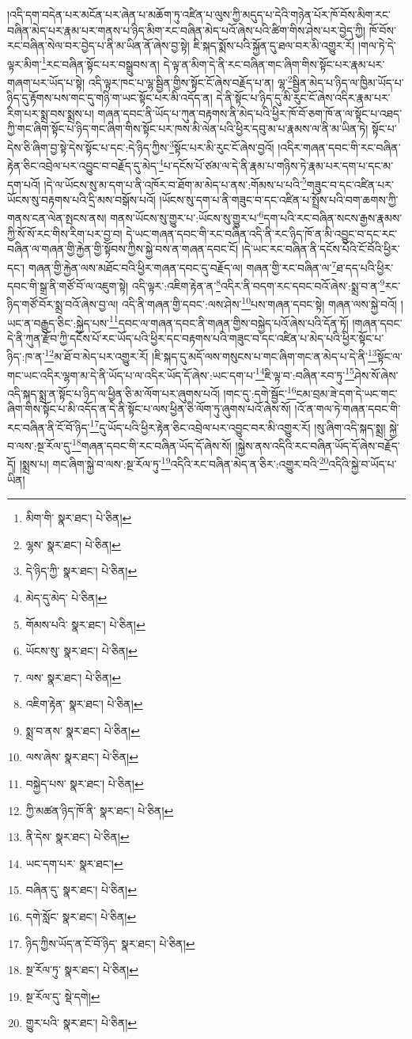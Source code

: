 །འདི་དག་བདེན་པར་མངོན་པར་ཞེན་པ་མཆོག་ཏུ་འཛིན་པ་ལུས་ཀྱི་མདུད་པ་དེའི་གཉེན་པོར་ཁོ་བོས་མིག་རང་བཞིན་མེད་པར་རྣམ་པར་གནས་པ་ཉིད་མིག་རང་བཞིན་མེད་པའོ་ཞེས་པའི་ཚིག་གིས་ཤེས་པར་བྱེད་ཀྱི། ཁོ་བོས་རང་བཞིན་སེལ་བར་བྱེད་པ་ནི་མ་ཡིན་ནོ་ཞེས་བྱ་སྟེ། ཇི་སྐད་སྨོས་པའི་སྐྱོན་དུ་ཐལ་བར་མི་འགྱུར་རོ། །གལ་ཏེ་དེ་ལྟར་མིག་\footnote{མིག་གི་  སྣར་ཐང་།  པེ་ཅིན། }རང་བཞིན་སྟོང་པར་བསྒྲུབས་ན། དེ་ལྟ་ན་མིག་དེ་ནི་རང་བཞིན་གང་ཞིག་གིས་སྟོང་པར་རྣམ་པར་གཞག་པར་ཡོད་པ་སྟེ། འདི་ལྟར་ཁང་པ་ལྷ་སྦྱིན་གྱིས་སྟོང་ངོ་ཞེས་བརྗོད་པ་ན། ལྷ་\footnote{ལྷས་  སྣར་ཐང་།  པེ་ཅིན། }སྦྱིན་མེད་པ་ཉིད་ལ་ཁྱིམ་ཡོད་པ་ཉིད་དུ་རྟོགས་པས་གང་དུ་གཉི་ག་ཡང་སྟོང་པར་མི་འདོད་ན། དེ་ནི་སྟོང་པ་ཉིད་དུ་མི་རུང་ངོ་ཞེས་འདིར་རྣམ་པར་རིག་པར་སྨྲ་བས་སྨྲས་པ། གཞན་དབང་ནི་ཡོད་པ་ཀུན་བརྟགས་ནི་མེད་པའི་ཕྱིར་ཁོ་བོ་ཅག་ཁོ་ན་ལ་སྟོང་པ་འཐད་ཀྱི་གང་ཞིག་སྟོང་པ་ཉིད་གང་ཞིག་གིས་སྟོང་པར་ཁས་མི་ལེན་པའི་ཕྱིར་དབུ་མ་པ་རྣམས་ལ་ནི་མ་ཡིན་ཏེ། སྟོང་པ་དེས་ཅི་ཞིག་བྱ་སྟེ་དེས་སྟོང་པ་དང་:དེ་ཉིད་ཀྱིས་\footnote{དེ་ཉིད་ཀྱི་  སྣར་ཐང་།  པེ་ཅིན། }སྟོང་པར་མི་རུང་ངོ་ཞེས་བྱའོ། །འདིར་གཞན་དབང་གི་རང་བཞིན་རྟེན་ཅིང་འབྲེལ་པར་འབྱུང་བ་བརྗོད་དུ་མེད་\footnote{མེད་དུ་མེད་  པེ་ཅིན། }པ་དངོས་པོ་ཙམ་ལ་དེ་ནི་རྣམ་པ་གཉིས་ཏེ་རྣམ་པར་དག་པ་དང་མ་དག་པའོ། །དེ་ལ་ཡོངས་སུ་མ་དག་པ་ནི་འཁོར་བ་ཐོག་མ་མེད་པ་ནས་:གོམས་པ་པའི་\footnote{གོམས་པའི་  སྣར་ཐང་།  པེ་ཅིན། }གཟུང་བ་དང་འཛིན་པར་ཡོངས་སུ་བརྟགས་པའི་དྲི་མས་བསྒོས་པའོ། །ཡོངས་སུ་དག་པ་ནི་གཟུང་བ་དང་འཛིན་པ་སྤྲོས་པའི་བག་ཆགས་ཀྱི་གནས་ངན་ལེན་སྤངས་ནས། གནས་ཡོངས་སུ་གྱུར་པ་:ཡོངས་སུ་གྱུར་པ་\footnote{ཡོངས་སུ་  སྣར་ཐང་།  པེ་ཅིན། }དག་པའི་རང་བཞིན་སངས་རྒྱས་རྣམས་ཀྱི་སོ་སོ་རང་གིས་རིག་པར་བྱ་བ། དེ་ཡང་གཞན་དབང་གི་རང་བཞིན་འདི་ནི་རང་ཉིད་ཁོ་ན་མི་འབྱུང་བ་དང་རང་བཞིན་ལ་གཞན་གྱི་རྐྱེན་གྱི་སྟོབས་ཀྱིས་སྐྱེ་བས་ན་གཞན་དབང་ངོ། །དེ་ཡང་རང་བཞིན་ནི་དངོས་པོའི་ངོ་བོའི་ཕྱིར་དང་། གཞན་གྱི་རྐྱེན་ལས་མཐོང་བའི་ཕྱིར་གཞན་དབང་དུ་བརྗོད་ལ། གཞན་གྱི་རང་བཞིན་ལ་\footnote{ལས་  སྣར་ཐང་།  པེ་ཅིན། }ཐ་དད་པའི་ཕྱིར་དབང་གི་སྒྲ་ནི་གཙོ་བོ་ལ་འཇུག་སྟེ། འདི་ལྟར་:འཇིག་རྟེན་ན་\footnote{འཇིག་རྟེན་  སྣར་ཐང་།  པེ་ཅིན། }འདིར་ནི་བདག་རང་དབང་བའོ་ཞེས་:སྨྲ་བ་ན་\footnote{སྨྲ་བ་ནས་  སྣར་ཐང་།  པེ་ཅིན། }རང་ཉིད་གཙོ་བོར་སྨྲ་བའོ་ཞེས་བྱ་ལ། འདི་ནི་གཞན་གྱི་དབང་:ལས་ཤེས་\footnote{ལས་ཞེས་  སྣར་ཐང་།  པེ་ཅིན། }པས་གཞན་དབང་སྟེ། གཞན་ལས་སྐྱེ་བའོ། །ཡང་ན་བརྒྱུད་ཅིང་:སྐྱེད་པས་\footnote{བསྐྱེད་པས་  སྣར་ཐང་།  པེ་ཅིན། }དབང་ལ་གཞན་དབང་ནི་གཞན་གྱིས་བསྐྱེད་པའོ་ཞེས་པའི་དོན་ཏོ། །གཞན་དབང་དེ་ནི་ཀུན་རྫོབ་ཀྱི་དངོས་པོ་རང་ཡོད་པའི་ཕྱིར་དང་བརྟགས་པའི་གཟུང་བ་དང་འཛིན་པ་མེད་པའི་ཕྱིར་སྟོང་པ་ཉིད་:ཁ་ན་\footnote{ཀྱི་མཚན་ཉིད་ཁོ་ནི་  སྣར་ཐང་།  པེ་ཅིན། }མ་ཐོ་བ་མེད་པར་འགྱུར་རོ། །ཇི་སྐད་དུ་མདོ་ལས་གསུངས་པ་གང་ཞིག་གང་ན་མེད་པ་དེ་ནི་\footnote{ནི་དེས་  སྣར་ཐང་།  པེ་ཅིན། }སྟོང་ལ་གང་ཡང་འདིར་ལྷག་མ་དེ་ནི་ཡོད་པ་ལ་འདིར་ཡོད་དོ་ཞེས་:ཡང་དག་པ་\footnote{ཡང་དག་པར་  སྣར་ཐང་། }ཇི་ལྟ་བ་:བཞིན་རབ་ཏུ་\footnote{བཞིན་དུ་  སྣར་ཐང་།  པེ་ཅིན། }ཤེས་སོ་ཞེས་འདི་སྐད་སྨྲ་ན་སྟོང་པ་ཉིད་ལ་ཕྱིན་ཅི་མ་ལོག་པར་ཞུགས་པའོ། །གང་དུ་:དགེ་སྦྱོང་\footnote{དགེ་སློང་  སྣར་ཐང་།  པེ་ཅིན། }ངམ་བྲམ་ཟེ་དག་དེ་ཡང་གང་ཞིག་གིས་སྟོང་པ་མི་འདོད་ན་དེ་ནི་སྟོང་པ་ལས་ཕྱིན་ཅི་ལོག་ཏུ་ཞུགས་པའོ་ཞེས་སོ། །འོ་ན་གལ་ཏེ་གཞན་དབང་གི་རང་བཞིན་ནི་ངོ་བོ་ཉིད་\footnote{ཉིད་ཀྱིས་ཡོད་ན་ངོ་བོ་ཉིད་  སྣར་ཐང་།  པེ་ཅིན། }དུ་ཡོད་པའི་ཕྱིར་རྟེན་ཅིང་འབྲེལ་པར་འབྱུང་བར་མི་འགྱུར་རོ། །སུ་ཞིག་འདི་སྐད་སྨྲ། སྐྱེ་བ་ལས་:སྔ་རོལ་དུ་\footnote{སྔ་རོལ་ཏུ་  སྣར་ཐང་།  པེ་ཅིན། }གཞན་དབང་གི་རང་བཞིན་ཡོད་དོ་ཞེས་སོ། །སྐྱེས་ནས་འདིའི་རང་བཞིན་ཡོད་དོ་ཞེས་བརྗོད་དོ། །སྨྲས་པ། གང་ཞིག་སྐྱེ་བ་ལས་:སྔ་རོལ་ཏུ་\footnote{སྔ་རོལ་དུ་  སྡེ་དགེ། }འདིའི་རང་བཞིན་མེད་ན་ཅིར་:འགྱུར་བའི་\footnote{གྱུར་པའི་  སྣར་ཐང་།  པེ་ཅིན། }འདིའི་སྐྱེ་བ་ཡོད་པ་ཡིན། 